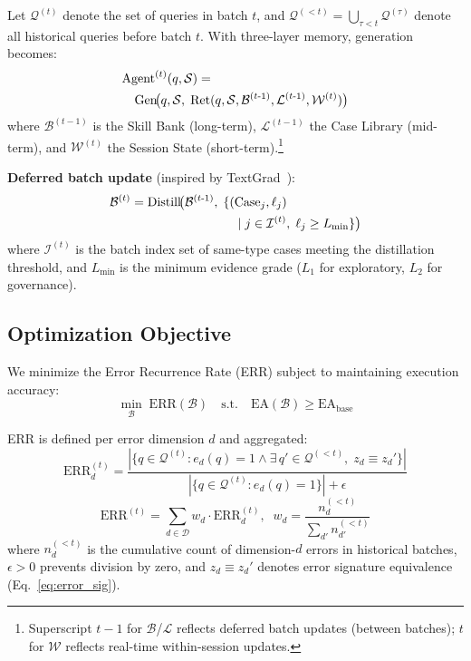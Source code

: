 Let $\mathcal{Q}^{(t)}$ denote the set of queries in batch $t$, and $\mathcal{Q}^{(<t)} = \bigcup_{\tau < t} \mathcal{Q}^{(\tau)}$ denote all historical queries before batch $t$. With three-layer memory, generation becomes:
\begin{align}
  &\text{Agent}^{(t)}(q, \mathcal{S}) = \notag \\
  &\quad \text{Gen}\!\big(q, \mathcal{S},\; \text{Ret}(q, \mathcal{S}, \mathcal{B}^{(t\text{-}1)}, \mathcal{L}^{(t\text{-}1)}, \mathcal{W}^{(t)})\big)
  \label{eq:agent}
\end{align}
where $\mathcal{B}^{(t-1)}$ is the Skill Bank (long-term), $\mathcal{L}^{(t-1)}$ the Case Library (mid-term), and $\mathcal{W}^{(t)}$ the Session State (short-term).\footnote{Superscript $t{-}1$ for $\mathcal{B}$/$\mathcal{L}$ reflects deferred batch updates (between batches); $t$ for $\mathcal{W}$ reflects real-time within-session updates.}

\textbf{Deferred batch update} (inspired by TextGrad~\cite{yuksekgonul2024textgrad}):
\begin{align}
  \mathcal{B}^{(t)} = \text{Distill}\!\big(\mathcal{B}^{(t\text{-}1)},\;
  \{(&\text{Case}_j, \ell_j) \notag \\
  &\mid j \in \mathcal{I}^{(t)},\; \ell_j \geq L_{\min}\}\big)
  \label{eq:distill}
\end{align}
where $\mathcal{I}^{(t)}$ is the batch index set of same-type cases meeting the distillation threshold, and $L_{\min}$ is the minimum evidence grade ($L_1$ for exploratory, $L_2$ for governance).

\subsection{Optimization Objective}
\label{subsec:objective}

We minimize the Error Recurrence Rate (ERR) subject to maintaining execution accuracy:
\begin{equation}
  \min_{\mathcal{B}}\; \text{ERR}(\mathcal{B}) \quad \text{s.t.} \quad \text{EA}(\mathcal{B}) \geq \text{EA}_{\text{base}}
  \label{eq:objective}
\end{equation}

ERR is defined per error dimension $d$ and aggregated:
\begin{equation}
  \text{ERR}_d^{(t)} = \frac{|\{q \in \mathcal{Q}^{(t)} : e_d(q){=}1 \wedge \exists\, q' {\in} \mathcal{Q}^{(<t)},\; z_d \equiv z_d'\}|}{|\{q \in \mathcal{Q}^{(t)} : e_d(q){=}1\}| + \epsilon}
  \label{eq:err_d}
\end{equation}
\begin{equation}
  \text{ERR}^{(t)} \!=\! \sum_{d \in \mathcal{D}} w_d \cdot \text{ERR}_d^{(t)}, \;\; w_d = \frac{n_d^{(<t)}}{\sum_{d'} n_{d'}^{(<t)}}
  \label{eq:err_total}
\end{equation}
where $n_d^{(<t)}$ is the cumulative count of dimension-$d$ errors in historical batches, $\epsilon > 0$ prevents division by zero, and $z_d \equiv z_d'$ denotes error signature equivalence (Eq.~\ref{eq:error_sig}).


